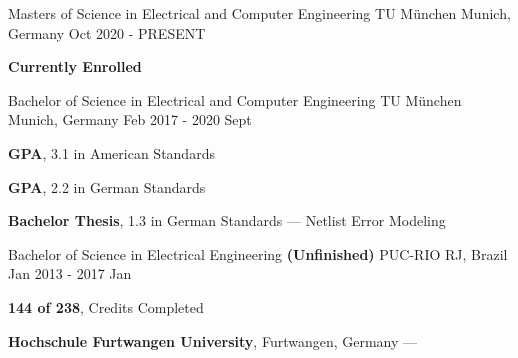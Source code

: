 
\begin{cventries}
  \cventry
    {Masters of Science in Electrical and Computer Engineering} %
    {TU München} %
    {Munich, Germany} %
    {Oct 2020 - PRESENT} %
    {
      \begin{cvitems} %
      \item {\textbf{Currently Enrolled}}
      \end{cvitems}
    }

  \cventry
    {Bachelor of Science in Electrical and Computer Engineering} %
    {TU München} %
    {Munich, Germany} %
    {Feb 2017 - 2020 Sept} %
    {
      \begin{cvitems} %
      \item {\textbf{GPA}, 3.1 in American Standards}
         \vspace{0.5mm}
         \item {\textbf{GPA}, 2.2 in German Standards}
         \vspace{0.5mm}
         \item {\textbf{Bachelor Thesis}, 1.3 in German Standards --- Netlist Error Modeling}
      \end{cvitems}
    }

  \cventry
    {Bachelor of Science in Electrical Engineering \textbf{(Unfinished)}} %
    {PUC-RIO} %
    {RJ, Brazil} %
    {Jan 2013 - 2017 Jan} %
    {
      \begin{cvitems} %
        \item {\textbf{144 of 238}, Credits Completed}
        \vspace{0.5mm}
        \item {\textbf{Hochschule Furtwangen University}, Furtwangen, Germany --- }
      \end{cvitems}
    }
\end{cventries}
